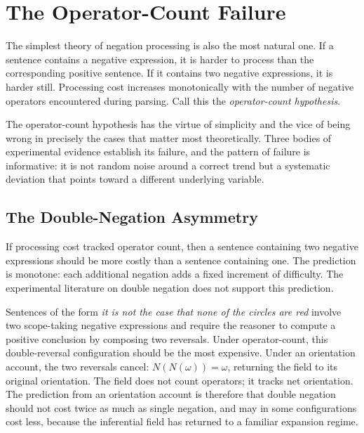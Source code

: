 \documentclass[12pt]{article}
\theoremstyle{remark}
\begin{document}
\begin{abstract}
The framework connects to a broader research program in admissibility 
geometry and distinguishability theory, in which the same mathematical 
structure --- distinctions, reachability, orientation, admissibility --- 
recurs across language, memory, repair, and scientific explanation. 
Negation, on this view, is not an addition to logic. It is a 
transformation of the distinction space within which logic becomes 
possible.
\end{abstract}

\newpage

\section{The Operator-Count Failure}

The simplest theory of negation processing is also the most natural one.
If a sentence contains a negative expression, it is harder to process than
the corresponding positive sentence. If it contains two negative
expressions, it is harder still. Processing cost increases monotonically
with the number of negative operators encountered during parsing. Call
this the \emph{operator-count hypothesis}.

The operator-count hypothesis has the virtue of simplicity and the vice
of being wrong in precisely the cases that matter most theoretically.
Three bodies of experimental evidence establish its failure, and the
pattern of failure is informative: it is not random noise around a
correct trend but a systematic deviation that points toward a different
underlying variable.

\subsection{The Double-Negation Asymmetry}

If processing cost tracked operator count, then a sentence containing two
negative expressions should be more costly than a sentence containing one.
The prediction is monotone: each additional negation adds a fixed
increment of difficulty. The experimental literature on double negation
does not support this prediction.

Sentences of the form \emph{it is not the case that none of the circles
are red} involve two scope-taking negative expressions and require the
reasoner to compute a positive conclusion by composing two reversals.
Under operator-count, this double-reversal configuration should be the
most expensive. Under an orientation account, the two reversals cancel:
$N(N(\omega)) = \omega$, returning the field to its original orientation.
The field does not count operators; it tracks net orientation. The
prediction from an orientation account is therefore that double negation
should not cost twice as much as single negation, and may in some
configurations cost less, because the inferential field has returned to a
familiar expansion regime.
\end{document}
